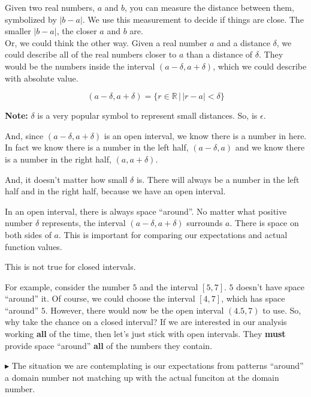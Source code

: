 \documentclass{ximera}
\begin{document}
Given two real numbers, $a$ and $b$, you can measure the distance between them, symbolized by $|b-a|$.  We use this measurement to decide if things are close.  The smaller $|b-a|$, the closer $a$ and $b$ are. \\



Or, we could think the other way.  Given a real number $a$ and a distance $\delta$, we could describe all of the real numbers closer to $a$ than a distance of $\delta$.  They would be the numbers inside the interval $(a-\delta, a+\delta)$, which we could describe with absolute value.

\[      (a-\delta, a+\delta) = \{ r \in \mathbb{R} \, | \, |r - a| < \delta        \}       \]


\textbf{Note:}  $\delta$ is a very popular symbol to represent small distances.  So, is $\epsilon$.



And, since $(a-\delta, a+\delta)$ is an open interval, we know there is a number in here.  In fact we know there is a number in the left half, $(a-\delta, a)$ and we know there is a number in the right half, $(a, a+\delta)$.


And, it doesn't matter how small $\delta$ is.  There will always be a number in the left half and in the right half, because we have an open interval.


In an open interval, there is always space ``around''.  No matter what positive number $\delta$ represents, the interval $(a-\delta, a+\delta)$ surrounds $a$.  There is space on both sides of $a$. This is important for comparing our expectations and actual function values.





This is not true for closed intervals.


For example, consider the number $5$ and the interval $[5, 7]$.  $5$ doesn't have space ``around'' it. Of course, we could choose the interval $[4,7]$, which has space ``around'' $5$.  However, there would now be the open interval $(4.5, 7)$ to use.  So, why take the chance on a closed interval?  If we are interested in our analysis working \textbf{\textcolor{red!80!black}{all}} of the time, then let's just stick with open intervals.  They \textbf{must} provide space ``around'' \textbf{\textcolor{red!80!black}{all}} of the numbers they contain.





\textbf{\textcolor{red!90!darkgray}{$\blacktriangleright$}} The situation we are contemplating is our expectations from patterns ``around'' a domain number not matching up with the actual funciton at the domain number.
\end{document}
